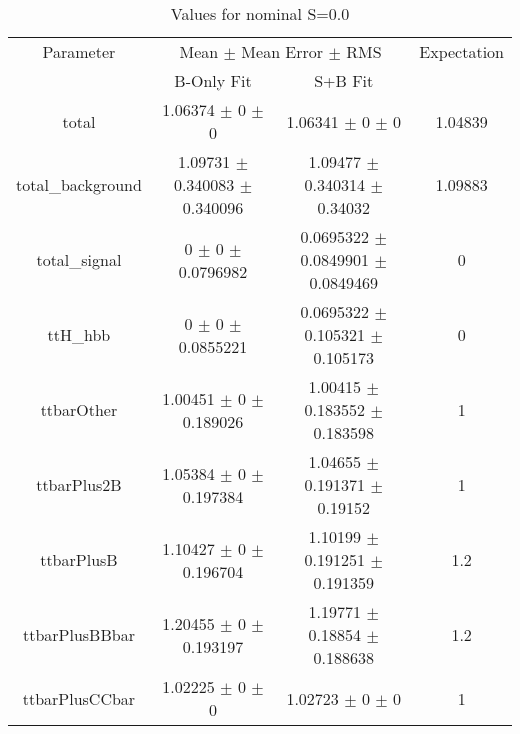 \begin{table}
\centering
\caption{Values for nominal S=0.0}
\begin{tabular}{cccc}
\toprule
Parameter & \multicolumn{2}{c}{Mean $\pm$ Mean Error $\pm$ RMS} & Expectation\\
 & B-Only Fit & S+B Fit & \\
\midrule
total & \num{1.06374} $\pm$ \num{0} $\pm$ \num{0} & \num{1.06341} $\pm$ \num{0} $\pm$ \num{0} & \num{1.04839}\\
total\_background & \num{1.09731} $\pm$ \num{0.340083} $\pm$ \num{0.340096} & \num{1.09477} $\pm$ \num{0.340314} $\pm$ \num{0.34032} & \num{1.09883}\\
total\_signal & \num{0} $\pm$ \num{0} $\pm$ \num{0.0796982} & \num{0.0695322} $\pm$ \num{0.0849901} $\pm$ \num{0.0849469} & \num{0}\\
ttH\_hbb & \num{0} $\pm$ \num{0} $\pm$ \num{0.0855221} & \num{0.0695322} $\pm$ \num{0.105321} $\pm$ \num{0.105173} & \num{0}\\
ttbarOther & \num{1.00451} $\pm$ \num{0} $\pm$ \num{0.189026} & \num{1.00415} $\pm$ \num{0.183552} $\pm$ \num{0.183598} & \num{1}\\
ttbarPlus2B & \num{1.05384} $\pm$ \num{0} $\pm$ \num{0.197384} & \num{1.04655} $\pm$ \num{0.191371} $\pm$ \num{0.19152} & \num{1}\\
ttbarPlusB & \num{1.10427} $\pm$ \num{0} $\pm$ \num{0.196704} & \num{1.10199} $\pm$ \num{0.191251} $\pm$ \num{0.191359} & \num{1.2}\\
ttbarPlusBBbar & \num{1.20455} $\pm$ \num{0} $\pm$ \num{0.193197} & \num{1.19771} $\pm$ \num{0.18854} $\pm$ \num{0.188638} & \num{1.2}\\
ttbarPlusCCbar & \num{1.02225} $\pm$ \num{0} $\pm$ \num{0} & \num{1.02723} $\pm$ \num{0} $\pm$ \num{0} & \num{1}\\
\bottomrule
\end{tabular}
\end{table}